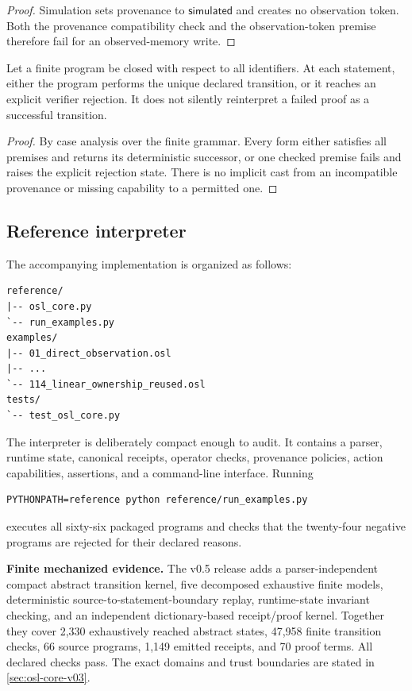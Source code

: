 \begin{proof}
Simulation sets provenance to \(\mathsf{simulated}\) and creates no observation
token.  Both the provenance compatibility check and the observation-token
premise therefore fail for an observed-memory write.
\end{proof}

\begin{theorem}
Let a finite \OSLCore program be closed with respect to all identifiers.  At
each statement, either the program performs the unique declared transition, or
it reaches an explicit verifier rejection.  It does not silently reinterpret a
failed proof as a successful transition.
\end{theorem}

\begin{proof}
By case analysis over the finite grammar.  Every form either satisfies all
premises and returns its deterministic successor, or one checked premise fails
and raises the explicit rejection state.  There is no implicit cast from an
incompatible provenance or missing capability to a permitted one.
\end{proof}

\subsection{Reference interpreter}

The accompanying implementation is organized as follows:
\begin{verbatim}
reference/
|-- osl_core.py
`-- run_examples.py
examples/
|-- 01_direct_observation.osl
|-- ...
`-- 114_linear_ownership_reused.osl
tests/
`-- test_osl_core.py
\end{verbatim}
The interpreter is deliberately compact enough to audit.  It contains a parser,
runtime state, canonical receipts, operator checks, provenance policies, action
capabilities, assertions, and a command-line interface.  Running
\begin{verbatim}
PYTHONPATH=reference python reference/run_examples.py
\end{verbatim}
executes all sixty-six packaged programs and checks that the twenty-four negative programs
are rejected for their declared reasons.

\begin{provedbox}
\textbf{Finite mechanized evidence.} The v0.5 release adds a parser-independent compact abstract transition kernel, five decomposed exhaustive finite models, deterministic source-to-statement-boundary replay, runtime-state invariant checking, and an independent dictionary-based receipt/proof kernel. Together they cover 2,330 exhaustively reached abstract states, 47,958 finite transition checks, 66 source programs, 1,149 emitted receipts, and 70 proof terms. All declared checks pass. The exact domains and trust boundaries are stated in \cref{sec:osl-core-v03}.
\end{provedbox}

